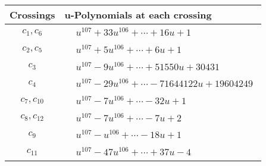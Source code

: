 \documentclass[1p]{elsarticle_modified}
\theoremstyle{definition}
\begin{document}
\begin{tabular}{m{50pt}|m{274pt}}
Crossings & \hspace{64pt}u-Polynomials at each crossing \\
\hline $$\begin{aligned}c_{1},c_{6}\end{aligned}$$&$\begin{aligned}
&u^{107}+33 u^{106}+\cdots+16 u+1
\end{aligned}$\\
\hline $$\begin{aligned}c_{2},c_{5}\end{aligned}$$&$\begin{aligned}
&u^{107}+5 u^{106}+\cdots+6 u+1
\end{aligned}$\\
\hline $$\begin{aligned}c_{3}\end{aligned}$$&$\begin{aligned}
&u^{107}-9 u^{106}+\cdots+51550 u+30431
\end{aligned}$\\
\hline $$\begin{aligned}c_{4}\end{aligned}$$&$\begin{aligned}
&u^{107}-29 u^{106}+\cdots-71644122 u+19604249
\end{aligned}$\\
\hline $$\begin{aligned}c_{7},c_{10}\end{aligned}$$&$\begin{aligned}
&u^{107}-7 u^{106}+\cdots-32 u+1
\end{aligned}$\\
\hline $$\begin{aligned}c_{8},c_{12}\end{aligned}$$&$\begin{aligned}
&u^{107}-7 u^{106}+\cdots-7 u+2
\end{aligned}$\\
\hline $$\begin{aligned}c_{9}\end{aligned}$$&$\begin{aligned}
&u^{107}- u^{106}+\cdots-18 u+1
\end{aligned}$\\
\hline $$\begin{aligned}c_{11}\end{aligned}$$&$\begin{aligned}
&u^{107}-47 u^{106}+\cdots+37 u-4
\end{aligned}$\\
\hline
\end{tabular}\\~\\
\end{document}
